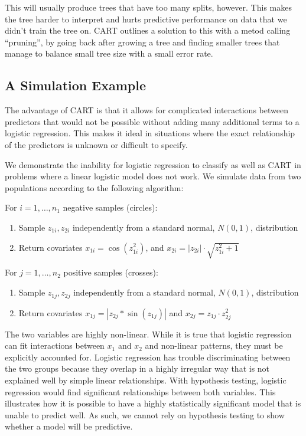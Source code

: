 \documentclass[11pt]{article}
\begin{document}
This will usually produce trees that have too many splits, however. This makes the tree harder to interpret and hurts predictive performance on data that we didn't train the tree on. CART outlines a solution to this with a metod calling ``pruning'', by going back after growing a tree and finding smaller trees that manage to balance small tree size with a small error rate.

\subsection*{A Simulation Example}
The advantage of CART is that it allows for complicated interactions between predictors that would not be possible without adding many additional terms to a logistic regression. This makes it ideal in situations where the exact relationship of the predictors is unknown or difficult to specify.

We demonstrate the inability for logistic regression to classify as well as CART in problems where a linear logistic model does not work. We simulate data from two populations according to the following algorithm:

For $i=1, \dots, n_1$ negative samples (circles):
\begin{enumerate}
\item Sample $z_{1i}, z_{2i}$ independently from a standard normal, $N(0,1)$, distribution
\item Return covariates $x_{1i} = \cos(z_{1i}^2)$, and $x_{2i} = \left|z_{2i} \right| \cdot \sqrt{z_{1i}^2 + 1}$
\end{enumerate}

For $j = 1, \dots, n_2$ positive samples (crosses):
\begin{enumerate}
\item Sample $z_{1j}, z_{2j}$ independently from a standard normal, $N(0,1)$, distribution
\item Return covariates $x_{1j} = |z_{2j}*\sin(z_{1j})|$ and $x_{2j} = z_{1j} \cdot z_{2j}^2$
\end{enumerate}

The two variables are highly non-linear. While it is true that logistic regression can fit interactions between $x_1$ and $x_2$ and non-linear patterns, they must be explicitly accounted for. Logistic regression has trouble discriminating between the two groups because they overlap in a highly irregular way that is not explained well by simple linear relationships. With hypothesis testing, logistic regression would find significant relationships between both variables. This illustrates how it is possible to have a highly statistically significant model that is unable to predict well. As such, we cannot rely on hypothesis testing to show whether a model will be predictive.
\end{document}
